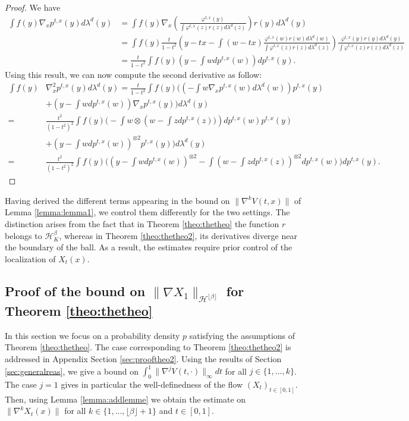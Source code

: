 \documentclass{article}
\begin{document}
\begin{proof} We have
\begin{align*}
    \int f(y) \nabla_x p^{t,x}(y)d\lambda^d(y)& =\int f(y) \nabla_x \left(\frac{ \varphi^{t,x}(y)}{\int \varphi^{t,x}(z)r(z)d\lambda^d(z)}\right)r(y)d\lambda^d(y)\\
    & =\int f(y) \frac{t}{1-t^2}\left(y-tx -\int (w-tx)\frac{ \varphi^{t,x}(w)r(w)d\lambda^d(w)}{\int \varphi^{t,x}(z)r(z)d\lambda^d(z)}\right) \frac{ \varphi^{t,x}(y)r(y)d\lambda^d(y)}{\int \varphi^{t,x}(z)r(z)d\lambda^d(z)}\\
    & =\frac{t}{1-t^2}\int f(y)\left(y-\int wdp^{t,x}(w)\right) dp^{t,x}(y).
\end{align*}
Using this result, we can now compute the second derivative as follow:
\begin{align*}
     \int f(y)&\nabla^2_xp^{t,x}(y)d\lambda^d(y)= \frac{t}{1-t^2}\int f(y)\Biggl(\left(-\int w\nabla_xp^{t,x}(w)d\lambda^d(w)\right)  p^{t,x}(y)\\
     & +\left(y-\int wdp^{t,x}(w)\right) \nabla_x p^{t,x}(y)\Biggl)d\lambda^d(y)\\
     = & \frac{t^2}{(1-t^2)^2}\int f(y)\Biggl(-\int w\otimes \left(w -\int zdp^{t,x}(z))\right)dp^{t,x}(w) p^{t,x}(y)\\
    & +\left(y-\int wdp^{t,x}(w)\right)^{\otimes 2} p^{t,x}(y)\Biggl)d\lambda^d(y)\\
    = & \frac{t^2}{(1-t^2)^2}\int f(y)\Biggl(\left(y -\int wdp^{t,x}(w)\right)^{\otimes 2} - \int \left(w -\int zdp^{t,x}(z)\right)^{\otimes 2} dp^{t,x}(w)\Biggl)dp^{t,x}(y).
\end{align*}
\end{proof}

Having derived the different terms appearing in the bound on $\|\nabla^{k} V(t,x)\|$ of Lemma \ref{lemma:lemma1}, we control them differently for the two settings. The distinction arises from the fact that in Theorem \ref{theo:thetheo} the function $r$ belongs to $\mathcal{H}_K^\beta$, whereas in Theorem \ref{theo:thetheo2}, its derivatives diverge near the boundary of the ball. As a result, the estimates require prior control of the localization of $X_t(x)$.








\subsection{Proof of the bound on  $\|\nabla X_1\|_{\mathcal{H}^{\lfloor \beta \rfloor}}$ for Theorem \ref{theo:thetheo}}
In this section we focus on  a probability density $p$ satisfying the assumptions of Theorem \ref{theo:thetheo}. The case corresponding to Theorem \ref{theo:thetheo2} is addressed in Appendix Section \ref{sec:prooftheo2}. Using the results of Section \ref{sec:generalreas}, we give a bound on $\int_0^1 \|\nabla^j V(t,\cdot)\|_\infty dt$ for all $j\in \{1,...,k\}$. The case $j=1$ gives in particular the well-definedness of the flow $(X_t)_{t\in [0,1]}$. Then, using Lemma \ref{lemma:addlemme} we obtain the estimate on $\|\nabla^k X_t(x)\|$ for all  $k\in \{1,...,\lfloor \beta \rfloor +1\}$ and $t\in[0,1]$.
\end{document}

